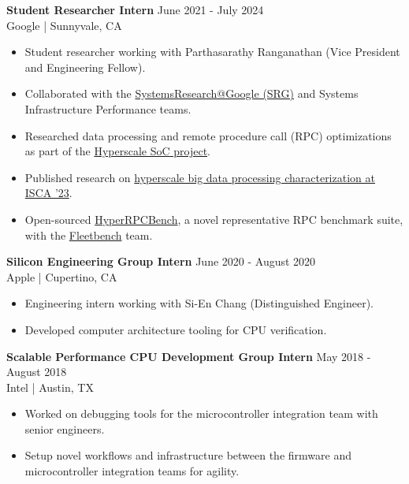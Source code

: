 \documentclass[line]{res}
\begin{document}
\begin{resume}
\vspace{-2mm}

\textbf{Student Researcher Intern} \hfill June 2021 - July 2024
\\
Google | Sunnyvale, CA
\\
\vspace{-3mm}
\begin{itemize}
\item Student researcher working with Parthasarathy Ranganathan (Vice President and Engineering Fellow).
\item Collaborated with the \href{https://techsysinfra.google/research/}{SystemsResearch@Google (SRG)} and Systems Infrastructure Performance teams.
\item Researched data processing and remote procedure call (RPC) optimizations as part of the \hyperref[sec:hyperscale-soc]{Hyperscale SoC project}.
\item Published research on \hyperref[sec:iscapaper]{hyperscale big data processing characterization at ISCA '23}.
\item Open-sourced \href{https://github.com/google/fleetbench/tree/cd20746b68b307b148a761c676d6400f2541082d/fleetbench/rpc}{HyperRPCBench}, a novel representative RPC benchmark suite, with the \href{https://github.com/google/fleetbench}{Fleetbench} team.
\end{itemize}

\vspace{-2mm}

\textbf{Silicon Engineering Group Intern} \hfill June 2020 - August 2020
\\
Apple | Cupertino, CA
\\
\vspace{-3mm}
\begin{itemize}
\item Engineering intern working with Si-En Chang (Distinguished Engineer).
\item Developed computer architecture tooling for CPU verification.
\end{itemize}

\vspace{-2mm}

\textbf{Scalable Performance CPU Development Group Intern} \hfill May 2018 - August 2018
\\
Intel | Austin, TX
\\
\vspace{-3mm}
\begin{itemize}
\item Worked on debugging tools for the microcontroller integration team with senior engineers.
\item Setup novel workflows and infrastructure between the firmware and microcontroller integration teams for agility.
\end{itemize}


\end{resume}
\end{document}
